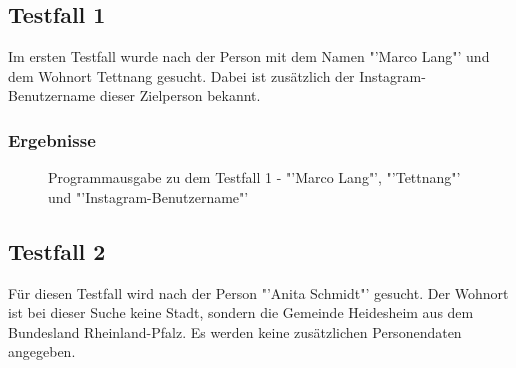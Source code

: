 	\subsection{Testfall 1}
	\label{subsec:Testfall1}
	Im ersten Testfall wurde nach der Person mit dem Namen "'Marco Lang"' und dem Wohnort Tettnang gesucht. Dabei ist zusätzlich der Instagram-Benutzername dieser Zielperson bekannt.
	\newpage
	\subsubsection{Ergebnisse}
		\begin{figure}[h!]
			\caption{Programmausgabe zu dem Testfall 1 - "'Marco Lang"', "'Tettnang"' und "'Instagram-Benutzername"'}
		\end{figure}
		\FloatBarrier
	\subsection{Testfall 2}
	\label{subsec:Testfall2}
	Für diesen Testfall wird nach der Person "'Anita Schmidt"' gesucht. Der Wohnort ist bei dieser Suche keine Stadt, sondern die Gemeinde Heidesheim aus dem Bundesland Rheinland-Pfalz. Es werden keine zusätzlichen Personendaten angegeben.
	\newpage
